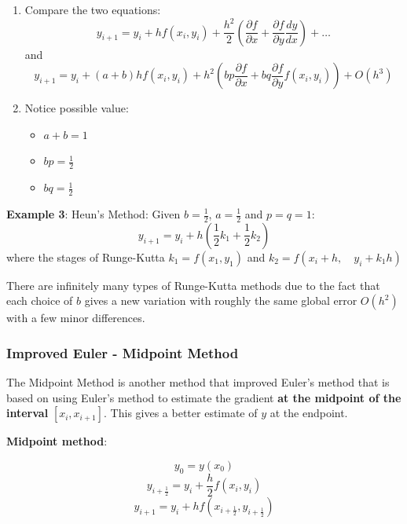 \documentclass[10pt,a4paper]{article}
\begin{document}
\begin{enumerate}
    \item Compare the two equations:
    $$
        y_{i+1}=y_i+hf(x_i,y_i)+\frac{h^2}{2}\left(\frac{\partial f}{\partial x} + \frac{\partial f}{\partial y}\frac{dy}{dx}\right) + \dots
    $$
    and
    $$
        y_{i+1}=y_i + (a+b)hf(x_i,y_i)+h^2\left(bp\frac{\partial f}{\partial x}+bq\frac{\partial f}{\partial y}f(x_i,y_i)\right) + O(h^3)
    $$
    
    \item Notice possible value:
    \begin{itemize}
        \item $a+b = 1$
        \item $bp=\frac{1}{2}$
        \item $bq=\frac{1}{2}$
    \end{itemize}
\end{enumerate}

\textbf{Example 3}: Heun's Method: Given $b=\frac{1}{2}$, $a=\frac{1}{2}$ and $p=q=1$:
$$
    y_{i+1}=y_i + h\left(\frac{1}{2}k_1 + \frac{1}{2}k_2\right)
$$
where the stages of Runge-Kutta $k_1=f(x_1, y_1)$ and $k_2=f(x_{i}+h, \quad y_{i}+k_1h)$ \par 

There are infinitely many types of Runge-Kutta methods due to the fact that each choice of $b$ gives
a new variation with roughly the same global error $O(h^2)$ with a few minor differences.

\subsubsection{Improved Euler - Midpoint Method}

The Midpoint Method is another method that improved Euler's method that is based on using Euler's
method to estimate the gradient \textbf{at the midpoint of the interval} $[x_i,x_{i+1}]$. This gives
a better estimate of $y$ at the endpoint.

\begin{tcolorbox}[breakable,colback=white,colframe=black,width=\dimexpr\textwidth+12mm\relax,enlarge left by=-6mm]
\textbf{Midpoint method}: \par 
$$
    y_0=y(x_0)
$$
$$
    y_{i+\frac{1}{2}} = y_i + \frac{h}{2}f(x_i,y_i) 
$$
$$
    y_{i+1} = y_i + hf(x_{i+\frac{1}{2}},y_{i+\frac{1}{2}})
$$
\end{tcolorbox}
\end{document}
